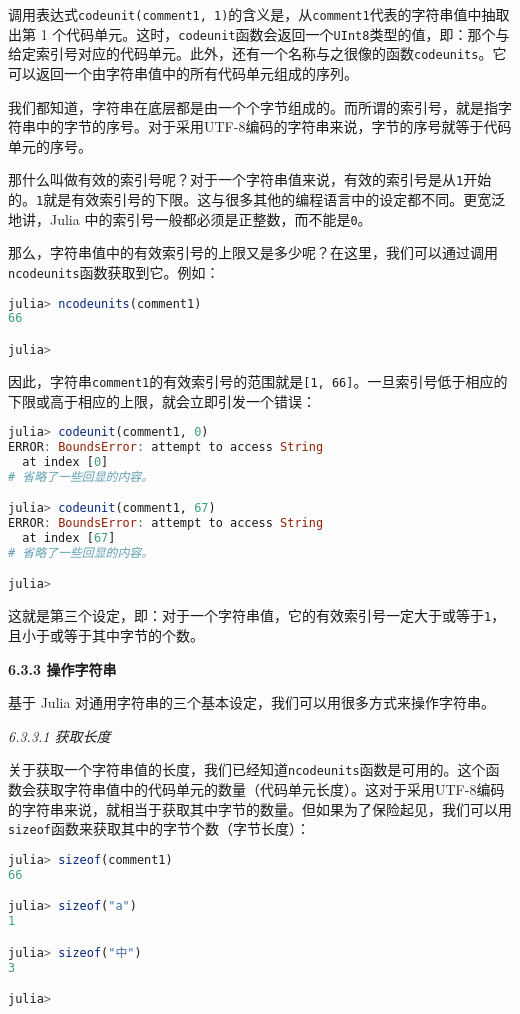 调用表达式\verb`codeunit(comment1, 1)`的含义是，从\verb`comment1`代表的字符串值中抽取出第 1 个代码单元。这时，\verb`codeunit`函数会返回一个\verb`UInt8`类型的值，即：那个与给定索引号对应的代码单元。此外，还有一个名称与之很像的函数\verb`codeunits`。它可以返回一个由字符串值中的所有代码单元组成的序列。

我们都知道，字符串在底层都是由一个个字节组成的。而所谓的索引号，就是指字符串中的字节的序号。对于采用UTF-8编码的字符串来说，字节的序号就等于代码单元的序号。

那什么叫做有效的索引号呢？对于一个字符串值来说，有效的索引号是从\verb`1`开始的。\verb`1`就是有效索引号的下限。这与很多其他的编程语言中的设定都不同。更宽泛地讲，Julia 中的索引号一般都必须是正整数，而不能是\verb`0`。

那么，字符串值中的有效索引号的上限又是多少呢？在这里，我们可以通过调用\verb`ncodeunits`函数获取到它。例如：
\begin{lstlisting}[language=julia]
julia> ncodeunits(comment1)
66

julia> 
\end{lstlisting}

因此，字符串\verb`comment1`的有效索引号的范围就是\verb`[1, 66]`。一旦索引号低于相应的下限或高于相应的上限，就会立即引发一个错误：
\begin{lstlisting}[language=julia]
julia> codeunit(comment1, 0)
ERROR: BoundsError: attempt to access String
  at index [0]
# 省略了一些回显的内容。

julia> codeunit(comment1, 67)
ERROR: BoundsError: attempt to access String
  at index [67]
# 省略了一些回显的内容。

julia> 
\end{lstlisting}

这就是第三个设定，即：对于一个字符串值，它的有效索引号一定大于或等于\verb`1`，且小于或等于其中字节的个数。

\textbf{6.3.3 操作字符串}

基于 Julia 对通用字符串的三个基本设定，我们可以用很多方式来操作字符串。

\textsl{6.3.3.1 获取长度}

关于获取一个字符串值的长度，我们已经知道\verb`ncodeunits`函数是可用的。这个函数会获取字符串值中的代码单元的数量（代码单元长度）。这对于采用UTF-8编码的字符串来说，就相当于获取其中字节的数量。但如果为了保险起见，我们可以用\verb`sizeof`函数来获取其中的字节个数（字节长度）：
\begin{lstlisting}[language=julia]
julia> sizeof(comment1)
66

julia> sizeof("a")
1

julia> sizeof("中")
3

julia> 
\end{lstlisting}

